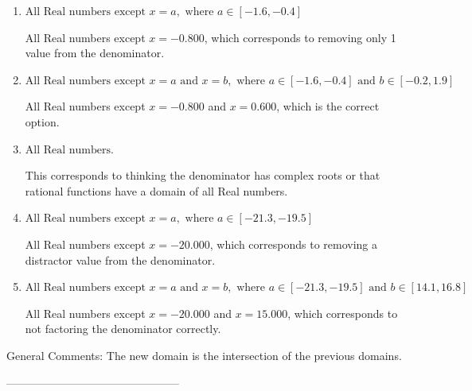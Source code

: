 \documentclass{extbook}[14pt]
\begin{document}
\begin{enumerate}[label=\Alph*.] 
\item $ \text{All Real numbers except } x = a, \text{ where } a \in [-1.6, -0.4] $ 

 All Real numbers except $x = -0.800$, which corresponds to removing only 1 value from the denominator. 
\item $ \text{All Real numbers except } x = a \text{ and } x = b, \text{ where } a \in [-1.6, -0.4] \text{ and } b \in [-0.2, 1.9] $ 

 All Real numbers except $x = -0.800$ and $x = 0.600$, which is the correct option. 
\item $ \text{All Real numbers.} $ 

 This corresponds to thinking the denominator has complex roots or that rational functions have a domain of all Real numbers. 
\item $ \text{All Real numbers except } x = a, \text{ where } a \in [-21.3, -19.5] $ 

 All Real numbers except $x = -20.000$, which corresponds to removing a distractor value from the denominator. 
\item $ \text{All Real numbers except } x = a \text{ and } x = b, \text{ where } a \in [-21.3, -19.5] \text{ and } b \in [14.1, 16.8] $ 

 All Real numbers except $x = -20.000$ and $x = 15.000$, which corresponds to not factoring the denominator correctly. 
\end{enumerate} 
 
General Comments: The new domain is the intersection of the previous domains.

-----------------------------------------------
\end{document}
